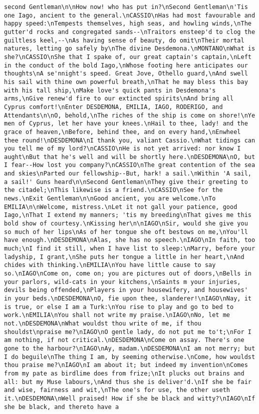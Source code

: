 \begin{verbatim}
second Gentleman\n\nHow now! who has put in?\nSecond Gentleman\n'Tis one Iago, ancient to the general.\nCASSIO\nHas had most favourable and happy speed:\nTempests themselves, high seas, and howling winds,\nThe gutter'd rocks and congregated sands--\nTraitors ensteep'd to clog the guiltless keel,--\nAs having sense of beauty, do omit\nTheir mortal natures, letting go safely by\nThe divine Desdemona.\nMONTANO\nWhat is she?\nCASSIO\nShe that I spake of, our great captain's captain,\nLeft in the conduct of the bold Iago,\nWhose footing here anticipates our thoughts\nA se'nnight's speed. Great Jove, Othello guard,\nAnd swell his sail with thine own powerful breath,\nThat he may bless this bay with his tall ship,\nMake love's quick pants in Desdemona's arms,\nGive renew'd fire to our extincted spirits\nAnd bring all Cyprus comfort!\nEnter DESDEMONA, EMILIA, IAGO, RODERIGO, and Attendants\n\nO, behold,\nThe riches of the ship is come on shore!\nYe men of Cyprus, let her have your knees.\nHail to thee, lady! and the grace of heaven,\nBefore, behind thee, and on every hand,\nEnwheel thee round!\nDESDEMONA\nI thank you, valiant Cassio.\nWhat tidings can you tell me of my lord?\nCASSIO\nHe is not yet arrived: nor know I aught\nBut that he's well and will be shortly here.\nDESDEMONA\nO, but I fear--How lost you company?\nCASSIO\nThe great contention of the sea and skies\nParted our fellowship--But, hark! a sail.\nWithin 'A sail, a sail!' Guns heard\n\nSecond Gentleman\nThey give their greeting to the citadel;\nThis likewise is a friend.\nCASSIO\nSee for the news.\nExit Gentleman\n\nGood ancient, you are welcome.\nTo EMILIA\n\nWelcome, mistress.\nLet it not gall your patience, good Iago,\nThat I extend my manners; 'tis my breeding\nThat gives me this bold show of courtesy.\nKissing her\n\nIAGO\nSir, would she give you so much of her lips\nAs of her tongue she oft bestows on me,\nYou'll have enough.\nDESDEMONA\nAlas, she has no speech.\nIAGO\nIn faith, too much;\nI find it still, when I have list to sleep:\nMarry, before your ladyship, I grant,\nShe puts her tongue a little in her heart,\nAnd chides with thinking.\nEMILIA\nYou have little cause to say so.\nIAGO\nCome on, come on; you are pictures out of doors,\nBells in your parlors, wild-cats in your kitchens,\nSaints m your injuries, devils being offended,\nPlayers in your housewifery, and housewives' in your beds.\nDESDEMONA\nO, fie upon thee, slanderer!\nIAGO\nNay, it is true, or else I am a Turk:\nYou rise to play and go to bed to work.\nEMILIA\nYou shall not write my praise.\nIAGO\nNo, let me not.\nDESDEMONA\nWhat wouldst thou write of me, if thou shouldst\npraise me?\nIAGO\nO gentle lady, do not put me to't;\nFor I am nothing, if not critical.\nDESDEMONA\nCome on assay. There's one gone to the harbour?\nIAGO\nAy, madam.\nDESDEMONA\nI am not merry; but I do beguile\nThe thing I am, by seeming otherwise.\nCome, how wouldst thou praise me?\nIAGO\nI am about it; but indeed my invention\nComes from my pate as birdlime does from frize;\nIt plucks out brains and all: but my Muse labours,\nAnd thus she is deliver'd.\nIf she be fair and wise, fairness and wit,\nThe one's for use, the other useth it.\nDESDEMONA\nWell praised! How if she be black and witty?\nIAGO\nIf she be black, and thereto have a 
\end{verbatim}
